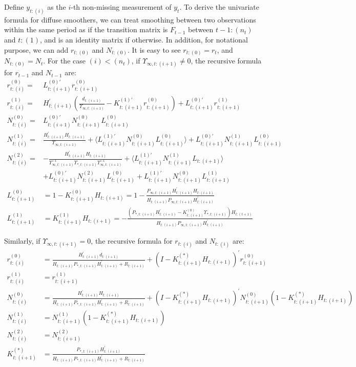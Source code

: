 \documentclass[10pt]{article}
\numberwithin{equation}{section}
\begin{document}
Define $y_{t:(i)}$ as the $i$-th non-missing measurement of $y_t$. To derive the univariate formula for diffuse smoothers, we can treat smoothing between two observations within the same period as if the transition matrix is $F_{t-1}$ between $t-1:(n_t)$ and $t:(1)$, and is an identity matrix if otherwise. In addition, for notational purpose, we can add $r_{t:(0)}$ and $N_{t:(0)}$. It is easy to see $r_{t:(0)}=r_t$, and $N_{t:(0)}=N_t$. For the case $(i)<(n_t)$, if $\Upsilon_{\infty,t:(i+1)}\neq0$, the recursive formula for $r_{t-1}$ and $N_{t-1}$ are:
\begin{align}
    r_{t:(i)}^{(0)} =& L_{t:(i+1)}^{(0)'}r_{t:(i+1)}^{(0)} \label{eq:diff_uni_start} \\ 
    r_{t:(i)}^{(1)} =& H_{t:(i+1)}^{'}\left(\frac{d_{t:(i+1)}}{\Upsilon_{\infty,t:(i+1)}}-K_{t:(i+1)}^{(1)'}r_{t:(i+1)}^{(0)}\right)+L_{t:(i+1)}^{(0)'}r_{t:(i+1)}^{(1)} \\
    N_{t:(i)}^{(0)} =& L_{t:(i+1)}^{(0)'}N_{t:(i+1)}^{(0)}L_{t:(i+1)}^{(0)} \\
    N_{t:(i)}^{(1)} =& \frac{H_{t:(i+1)}^{'}H_{t:(i+1)}}{\Upsilon_{\infty,t:(i+1)}} + \langle L_{t:(i+1)}^{(1)'}N_{t:(i+1)}^{(0)}L_{t:(i+1)}^{(0)}\rangle + L_{t:(i+1)}^{(0)'}N_{t:(i+1)}^{(1)}L_{t:(i+1)}^{(0)} \\
    N_{t:(i)}^{(2)} =& -\frac{H_{t:(i+1)}^{'}H_{t:(i+1)}}{\Upsilon_{\infty,t:(i+1)}^{-1}\Upsilon_{*,t:(i+1)}\Upsilon_{\infty,t:(i+1)}^{-1}} + \langle L_{t:(i+1)}^{(1)'}N_{t:(i+1)}^{(1)}L_{t:(i+1)}\rangle \nonumber \\
    &+L_{t:(i+1)}^{(0)'}N_{t:(i+1)}^{(2)}L_{t:(i+1)}^{(0)} + L_{t:(i+1)}^{(1)'}N_{t:(i+1)}^{(0)}L_{t:(i+1)}^{(1)} \\
    L_{t:(i+1)}^{(0)} &= 1-K_{t:(i+1)}^{(0)}H_{t:(i+1)}= 1-\frac{P_{\infty,t:(i+1)}H_{t:(i+1)}^{'}H_{t:(i+1)}}{H_{t:(i+1)}P_{\infty,t:(i+1)}H_{t:(i+1)}^{'}} \\
    L_{t:(i+1)}^{(1)} &= K_{t:(i+1)}^{(1)}H_{t:(i+1)}=-\frac{(P_{*,t:(i+1)}H_{t:(i+1)}^{'}-K_{t:(i+1)}^{(0)}\Upsilon_{*,t:(i+1)})H_{t:(t+1)}}{H_{t:(i+1)}P_{\infty,t:(i+1)}H_{t:(i+1)}^{'}}
\end{align}

Similarly, if $\Upsilon_{\infty,t:(i+1)}=0$, the recursive formula for $r_{t:(i)}$ and $N_{t:(i)}$ are:
\begin{align}
    r_{t:(i)}^{(0)} &= \frac{H_{t:(i+1)}^{'}d_{t:(i+1)}}{H_{t:(i+1)}P_{*,t:(i+1)}H_{t:(i+1)}^{'}+R_{t:(i+1)}} + (I-K_{t:(i+1)}^{(*)}H_{t:(i+1)})^{'}r_{t:(i+1)}^{(0)} \\
    r_{t:(i)}^{(1)} &= r_{t:(i+1)}^{(1)} \\ 
    N_{t:(i)}^{(0)} &= \frac{H_{t:(i+1)}^{'}H_{t:(i+1)}}{H_{t:(i+1)}P_{*,t:(i+1)}H_{t:(i+1)}^{'}+R_{t:(i+1)}}+(I-K_{t:(i+1)}^{(*)}H_{t:(i+1)})^{'}N_{t:(i+1)}^{(0)}(1-K_{t:(i+1)}^{(*)}H_{t:(i+1)}) \\
    N_{t:(i)}^{(1)} &= N_{t:(i+1)}^{(1)}(1-K_{t:(i+1)}^{(*)}H_{t:(i+1)}) \\
    N_{t:(i)}^{(2)} &= N_{t:(i+1)}^{(2)} \\
    K_{t:(i+1)}^{(*)} &= \frac{P_{*,t:(i+1)}H_{t:(i+1)}^{'}}{H_{t:(i+1)}P_{*,t:(i+1)}H_{t:(i+1)}^{'}+R_{t:(i+1)}}
\end{align}
\end{document}

